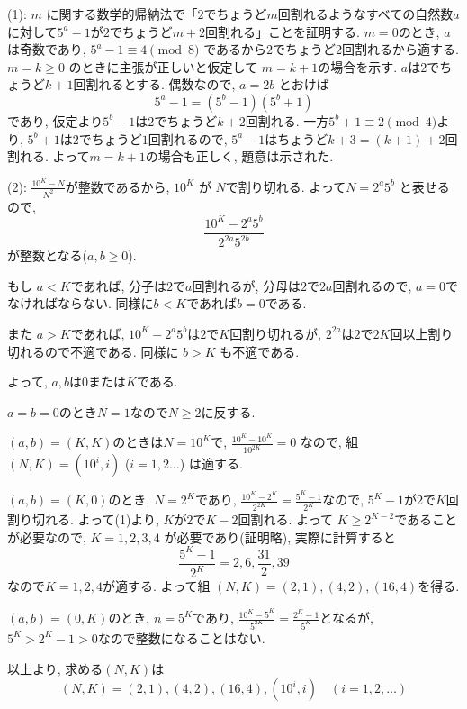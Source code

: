    (1): $m$ に関する数学的帰納法で「$2$でちょうど$m$回割れるようなすべての自然数$a$に対して$5^a - 1$が$2$でちょうど$m+2$回割れる」ことを証明する. $m=0$のとき, $a$は奇数であり, $5^a - 1 \equiv 4\pmod{8}$ であるから$2$でちょうど$2$回割れるから適する. $m=k\geq 0$ のときに主張が正しいと仮定して $m=k+1$の場合を示す. $a$は$2$でちょうど$k+1$回割れるとする. 偶数なので, $a = 2b$ とおけば
    $$
    5^a - 1 = (5^{b} - 1) (5^b + 1)
    $$
    であり, 仮定より$5^b- 1$は$2$でちょうど$k+2$回割れる. 一方$5^b + 1 \equiv 2\pmod{4}$より, $5^b+1$は$2$でちょうど$1$回割れるので, $5^a - 1$はちょうど$k+3 = (k+1) + 2$回割れる. よって$m=k+1$の場合も正しく, 題意は示された.


    (2): $\frac{10^K - N}{N^2}$が整数であるから, $10^K$ が $N$で割り切れる. よって$N=2^a5^b$ と表せるので,
    \[\frac{10^K - 2^a5^b}{2^{2a}5^{2b}}\]
    が整数となる($a,b\geq 0$).

    もし $a < K$であれば, 分子は$2$で$a$回割れるが, 分母は$2$で$2a$回割れるので, $a=0$でなければならない. 同様に$b < K$であれば$b=0$である.

    また $a > K$であれば, $10^K - 2^a5^b$は$2$で$K$回割り切れるが, $2^{2a}$は$2$で$2K$回以上割り切れるので不適である. 同様に $b>K$ も不適である.

    よって, $a,b$は$0$または$K$である.

    $a=b=0$のとき$N=1$なので$N\geq 2$に反する.

    $(a,b) = (K,K)$のときは$N=10^K$で, $\frac{10^K - 10^K}{10^{2K}} = 0$ なので, 組 $(N,K) = (10^i, i)$ ($i=1,2\dots$) は適する.

    $(a,b) = (K,0)$のとき, $N = 2^K$であり, $\frac{10^K - 2^K}{2^{2K}} = \frac{5^K - 1}{2^K}$なので, $5^{K}-1$が$2$で$K$回割り切れる. よって(1)より, $K$が$2$で$K-2$回割れる. よって $K \geq 2^{K-2}$であることが必要なので, $K=1,2,3,4$ が必要であり(証明略), 実際に計算すると
    \[
    \frac{5^K - 1}{2^K} = 2, 6, \frac{31}{2}, 39
    \]
    なので$K=1,2,4$が適する. よって組 $(N,K) = (2,1), (4,2), (16,4)$を得る.

    $(a,b) = (0,K)$のとき, $n=5^K$であり, $\frac{10^K - 5^K}{5^{2K}} = \frac{2^K - 1}{5^K}$となるが, $5^K > 2^K - 1 > 0$なので整数になることはない.

    以上より, 求める$(N,K)$は
    \[
    (N,K) = (2,1), (4,2), (16,4), (10^i, i) \quad (i=1,2,\dots)
    \]   
